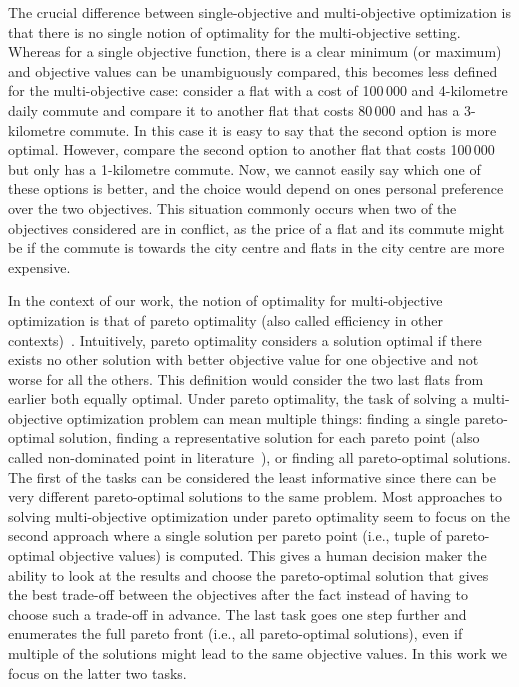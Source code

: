 The crucial difference between single-objective and multi-objective optimization is that there is no single notion of optimality for the multi-objective setting.
Whereas for a single objective function, there is a clear minimum (or maximum) and objective values can be unambiguously compared, this becomes less defined for the multi-objective case:
consider a flat with a cost of 100\,000 \texteuro{} and 4-kilometre daily commute and compare it to another flat that costs 80\,000 \texteuro{} and has a 3-kilometre commute.
In this case it is easy to say that the second option is more optimal.
However, compare the second option to another flat that costs 100\,000 \texteuro{} but only has a 1-kilometre commute.
Now, we cannot easily say which one of these options is better, and the choice would depend on ones personal preference over the two objectives.
This situation commonly occurs when two of the objectives considered are in conflict, as the price of a flat and its commute might be if the commute is towards the city centre and flats in the city centre are more expensive.

In the context of our work, the notion of optimality for multi-objective optimization is that of pareto optimality (also called efficiency in other contexts)~\autocite{Ehrgott2005-2}.
Intuitively, pareto optimality considers a solution optimal if there exists no other solution with better objective value for one objective and not worse for all the others. 
This definition would consider the two last flats from earlier both equally optimal.
Under pareto optimality, the task of solving a multi-objective optimization problem can mean multiple things:
finding a single pareto-optimal solution, finding a representative solution for each pareto point (also called non-dominated point in literature~\autocite{Ehrgott2005-2}), or finding all pareto-optimal solutions.
The first of the tasks can be considered the least informative since there can be very different pareto-optimal solutions to the same problem.
Most approaches to solving multi-objective optimization under pareto optimality seem to focus on the second approach where a single solution per pareto point (i.e., tuple of pareto-optimal objective values) is computed.
This gives a human decision maker the ability to look at the results and choose the pareto-optimal solution that gives the best trade-off between the objectives after the fact instead of having to choose such a trade-off in advance.
The last task goes one step further and enumerates the full pareto front (i.e., all pareto-optimal solutions), even if multiple of the solutions might lead to the same objective values.
In this work we focus on the latter two tasks.

